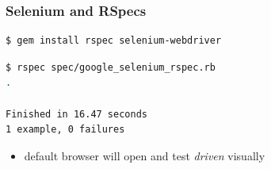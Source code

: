 \documentclass{beamer}
\begin{document}
\begin{frame}[fragile]\frametitle{Selenium and RSpecs} 

  \begin{lstlisting}[language=bash, escapechar={^}]
$ gem install rspec selenium-webdriver
  \end{lstlisting}

  \begin{lstlisting}[language=bash, escapechar={^}]
$ rspec spec/google_selenium_rspec.rb
.

Finished in 16.47 seconds
1 example, 0 failures
  \end{lstlisting}
  
  \begin{itemize}
    \item default browser will open and test \textit{driven} visually
  \end{itemize}
  
\end{frame}
\end{document}
